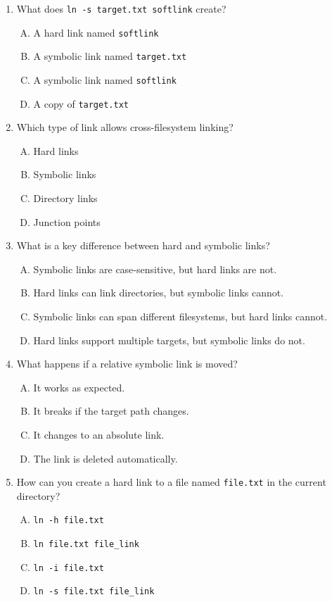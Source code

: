 \documentclass[a4paper]{report}
\begin{document}
\begin{enumerate}[1.]
    \item What does \texttt{ln -s target.txt softlink} create?  
    \begin{enumerate}[A)]
        \item A hard link named \texttt{softlink}  
        \item A symbolic link named \texttt{target.txt}  
        \item A symbolic link named \texttt{softlink}  
        \item A copy of \texttt{target.txt}  
    \end{enumerate}

    \item Which type of link allows cross-filesystem linking?  
    \begin{enumerate}[A)]
        \item Hard links  
        \item Symbolic links  
        \item Directory links  
        \item Junction points  
    \end{enumerate}

    \item What is a key difference between hard and symbolic links?  
    \begin{enumerate}[A)]
        \item Symbolic links are case-sensitive, but hard links are not.  
        \item Hard links can link directories, but symbolic links cannot.  
        \item Symbolic links can span different filesystems, but hard links cannot.  
        \item Hard links support multiple targets, but symbolic links do not.  
    \end{enumerate}

    \item What happens if a relative symbolic link is moved?  
    \begin{enumerate}[A)]
        \item It works as expected.  
        \item It breaks if the target path changes.  
        \item It changes to an absolute link.  
        \item The link is deleted automatically.  
    \end{enumerate}

    \item How can you create a hard link to a file named \texttt{file.txt} in the current directory?  
    \begin{enumerate}[A)]
        \item \texttt{ln -h file.txt}  
        \item \texttt{ln file.txt file\_link}  
        \item \texttt{ln -i file.txt}  
        \item \texttt{ln -s file.txt file\_link}  
    \end{enumerate}


\end{enumerate}
\end{document}

